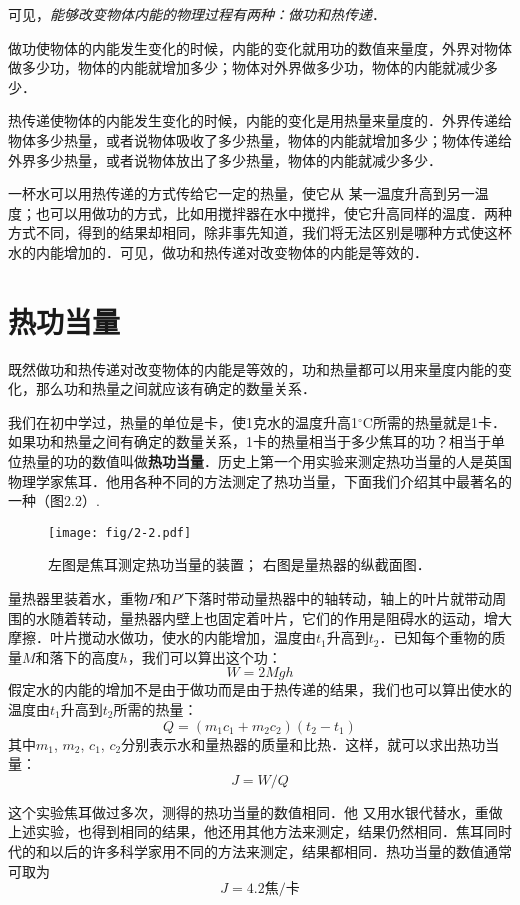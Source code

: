 可见，\textit{能够改变物体内能的物理过程有两种：做功和热传递}．

做功使物体的内能发生变化的时候，内能的变化就用功的数值来量度，外界对物体做多少功，物体的内能就增加多少；物体对外界做多少功，物体的内能就减少多少．

热传递使物体的内能发生变化的时候，内能的变化是用热量来量度的．外界传递给物体多少热量，或者说物体吸收了多少热量，物体的内能就增加多少；物体传递给外界多少热量，或者说物体放出了多少热量，物体的内能就减少多少．

一杯水可以用热传递的方式传给它一定的热量，使它从
某一温度升高到另一温度；也可以用做功的方式，比如用搅拌器在水中搅拌，使它升高同样的温度．两种方式不同，得到的结果却相同，除非事先知道，我们将无法区别是哪种方式使这杯水的内能增加的．可见，做功和热传递对改变物体的内能是等效的．

\section{热功当量}
既然做功和热传递对改变物体的内能是等效的，功和热量都可以用来量度内能的变化，那么功和热量之间就应该有确定的数量关系．

我们在初中学过，热量的单位是卡，使1克水的温度升高1$^\circ$C所需的热量就是1卡．如果功和热量之间有确定的数量关系，1卡的热量相当于多少焦耳的功？相当于单位热量的功的数值叫做\textbf{热功当量}．历史上第一个用实验来测定热功当量的人是英国物理学家焦耳．他用各种不同的方法测定了热功当量，下面我们介绍其中最著名的一种（图2.2）.

\begin{figure}[htp]
\centering\texttt{[image: fig/2-2.pdf]}
\caption{左图是焦耳测定热功当量的装置；
右图是量热器的纵截面图．}
\end{figure}


量热器里装着水，重物$P$和$P'$下落时带动量热器中的轴转动，轴上的叶片就带动周围的水随着转动，量热器内壁上也固定着叶片，它们的作用是阻碍水的运动，增大摩擦．叶片搅动水做功，使水的内能增加，温度由$t_1$升高到$t_2$．已知每个重物的质量$M$和落下的高度$h$，我们可以算出这个功：
$$W=2Mgh $$
假定水的内能的增加不是由于做功而是由于热传递的结果，我们也可以算出使水的温度由$t_1$升高到$t_2$所需的热量：
\[Q=(m_1c_1+m_2c_2)(t_2-t_1)\]
其中$m_1$, $m_2$, $c_1$, $c_2$分别表示水和量热器的质量和比热．这样，就可以求出热功当量：
\[J=W/Q\]

这个实验焦耳做过多次，测得的热功当量的数值相同．他
又用水银代替水，重做上述实验，也得到相同的结果，他还用其他方法来测定，结果仍然相同．焦耳同时代的和以后的许多科学家用不同的方法来测定，结果都相同．热功当量的数值通常可取为
\[ J=4.2\text{焦/卡} \]

